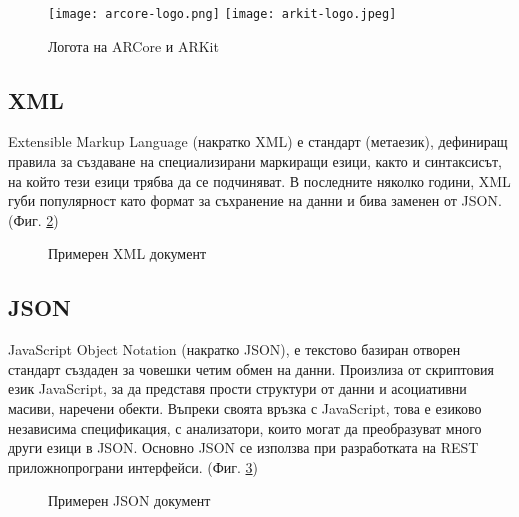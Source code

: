 \begin{figure}[H]
    \texttt{[image: arcore-logo.png]}
    \texttt{[image: arkit-logo.jpeg]}
    \centering
    \caption{Логота на ARCore и ARKit}
    \label{fig:arcore-arkit-logos}
\end{figure}

\subsection{XML}
Extensible Markup Language (накратко XML) е стандарт (метаезик), дефиниращ правила за създаване на специализирани маркиращи езици, както и синтаксисът, на който тези езици трябва да се подчиняват. В последните няколко години, XML губи популярност като формат за съхранение на данни и бива заменен от JSON. (Фиг. \ref{fig:example-xml})

\begin{figure}[H]
    
    \centering
    \caption{Примерен XML документ}
    \label{fig:example-xml}
\end{figure}

\subsection{JSON}
JavaScript Object Notation (накратко JSON), е текстово базиран отворен стандарт създаден за човешки четим обмен на данни. Произлиза от скриптовия език JavaScript, за да представя прости структури от данни и асоциативни масиви, наречени обекти. Въпреки своята връзка с JavaScript, това е езиково независима спецификация, с анализатори, които могат да преобразуват много други езици в JSON. Основно JSON се използва при разработката на REST приложнопрограни интерфейси. (Фиг. \ref{fig:example-json})

\begin{figure}[H]
    
    \centering
    \caption{Примерен JSON документ}
    \label{fig:example-json}
\end{figure}
